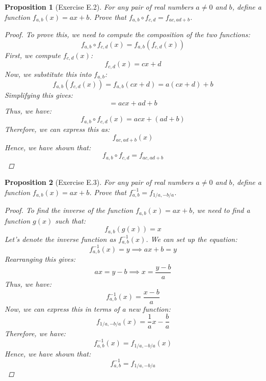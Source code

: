 \documentclass[12pt]{article}
\newtheorem{proposition}{Proposition}
\begin{document}
\begin{proposition}[Exercise E.2]
  For any pair of real numbers $a \neq 0$ and $b$, define a function $f_{a,b}(x) = ax + b$.
  Prove that $f_{a,b} \circ f_{c,d} = f_{ac, ad + b}$.
  \begin{proof}
    To prove this, we need to compute the composition of the two functions:
    \[
      f_{a,b} \circ f_{c,d}(x) = f_{a,b}(f_{c,d}(x))
    \]
    First, we compute $f_{c,d}(x)$:
    \[
      f_{c,d}(x) = cx + d
    \]
    Now, we substitute this into $f_{a,b}$:
    \[
      f_{a,b}(f_{c,d}(x)) = f_{a,b}(cx + d) = a(cx + d) + b
    \]
    Simplifying this gives:
    \[
      = acx + ad + b
    \]
    Thus, we have:
    \[
      f_{a,b} \circ f_{c,d}(x) = acx + (ad + b)
    \]
    Therefore, we can express this as:
    \[
      f_{ac, ad + b}(x)
    \]
    Hence, we have shown that:
    \[
      f_{a,b} \circ f_{c,d} = f_{ac, ad + b}
    \]
  \end{proof}
\end{proposition}


\begin{proposition}[Exercise E.3]
  For any pair of real numbers $a \neq 0$ and $b$, define a function $f_{a,b}(x) = ax + b$.
  Prove that $f_{a,b}^{-1} = f_{1/a, -b/a}$.
  \begin{proof}
    To find the inverse of the function $f_{a,b}(x) = ax + b$, we need to find a function $g(x)$ such that:
    \[
      f_{a,b}(g(x)) = x
    \]
    Let's denote the inverse function as $f_{a,b}^{-1}(x)$.
    We can set up the equation:
    \[
      f_{a,b}^{-1}(x) = y \implies ax + b = y
    \]
    Rearranging this gives:
    \[
      ax = y - b \implies x = \frac{y - b}{a}
    \]
    Thus, we have:
    \[
      f_{a,b}^{-1}(x) = \frac{x - b}{a}
    \]
    Now, we can express this in terms of a new function:
    \[
      f_{1/a, -b/a}(x) = \frac{1}{a}x - \frac{b}{a}
    \]
    Therefore, we have:
    \[
      f_{a,b}^{-1}(x) = f_{1/a, -b/a}(x)
    \]
    Hence, we have shown that:
    \[
      f_{a,b}^{-1} = f_{1/a, -b/a}
    \]
  \end{proof}
\end{proposition}
\end{document}
